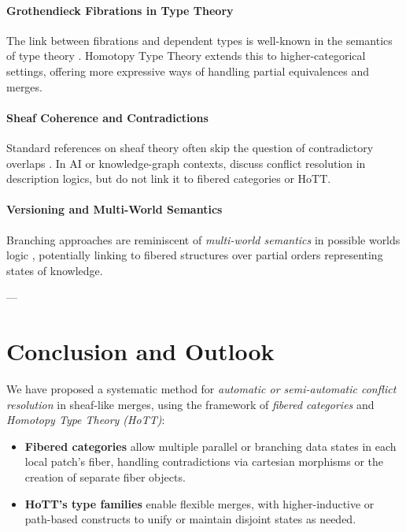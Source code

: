 \documentclass{article}
\begin{document}
\paragraph{Grothendieck Fibrations in Type Theory}
The link between fibrations and dependent types is well-known in the semantics of type theory \citep{jacobs1999categorical}. Homotopy Type Theory extends this to higher-categorical settings, offering more expressive ways of handling partial equivalences and merges.

\paragraph{Sheaf Coherence and Contradictions}
Standard references on sheaf theory often skip the question of contradictory overlaps \citep{maclane1971categories, johnstone2002sketches}. In AI or knowledge-graph contexts, \citet{baader2005description} discuss conflict resolution in description logics, but do not link it to fibered categories or HoTT.

\paragraph{Versioning and Multi-World Semantics}
Branching approaches are reminiscent of \emph{multi-world semantics} in possible worlds logic \citep{lewis1986plurality}, potentially linking to fibered structures over partial orders representing states of knowledge.

---

\section{Conclusion and Outlook}
\label{sec:conclusion}

We have proposed a systematic method for \emph{automatic or semi-automatic conflict resolution} in sheaf-like merges, using the framework of \emph{fibered categories} and \emph{Homotopy Type Theory (HoTT)}:
\begin{itemize}
    \item \textbf{Fibered categories} allow multiple parallel or branching data states in each local patch’s fiber, handling contradictions via cartesian morphisms or the creation of separate fiber objects.
    \item \textbf{HoTT’s type families} enable flexible merges, with higher-inductive or path-based constructs to unify or maintain disjoint states as needed.
\end{itemize}
\end{document}
